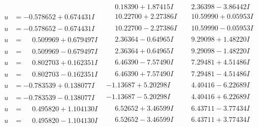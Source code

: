\documentclass[1p]{elsarticle_modified}
\theoremstyle{definition}
\begin{document}
$$\begin{array}{c|c|c}
 & \phantom{-}0.18390 + 1.87415 I & \phantom{-}2.36398 - 3.86442 I \\ \hline\begin{aligned}
u &= -0.578652 + 0.674431 I\end{aligned}
 & \phantom{-}10.22700 + 2.27386 I & \phantom{-}10.59990 + 0.05953 I \\ \hline\begin{aligned}
u &= -0.578652 - 0.674431 I\end{aligned}
 & \phantom{-}10.22700 - 2.27386 I & \phantom{-}10.59990 - 0.05953 I \\ \hline\begin{aligned}
u &= \phantom{-}0.509969 + 0.679497 I\end{aligned}
 & \phantom{-}2.36364 - 0.64965 I & \phantom{-}9.29098 + 1.48220 I \\ \hline\begin{aligned}
u &= \phantom{-}0.509969 - 0.679497 I\end{aligned}
 & \phantom{-}2.36364 + 0.64965 I & \phantom{-}9.29098 - 1.48220 I \\ \hline\begin{aligned}
u &= \phantom{-}0.802703 + 0.162351 I\end{aligned}
 & \phantom{-}6.46390 - 7.57490 I & \phantom{-}7.29481 + 4.51486 I \\ \hline\begin{aligned}
u &= \phantom{-}0.802703 - 0.162351 I\end{aligned}
 & \phantom{-}6.46390 + 7.57490 I & \phantom{-}7.29481 - 4.51486 I \\ \hline\begin{aligned}
u &= -0.783539 + 0.138077 I\end{aligned}
 & -1.13687 + 5.20298 I & \phantom{-}4.40416 - 6.22689 I \\ \hline\begin{aligned}
u &= -0.783539 - 0.138077 I\end{aligned}
 & -1.13687 - 5.20298 I & \phantom{-}4.40416 + 6.22689 I \\ \hline\begin{aligned}
u &= \phantom{-}0.495820 + 1.104130 I\end{aligned}
 & \phantom{-}6.52652 + 3.46599 I & \phantom{-}6.43711 - 3.77434 I \\ \hline\begin{aligned}
u &= \phantom{-}0.495820 - 1.104130 I\end{aligned}
 & \phantom{-}6.52652 - 3.46599 I & \phantom{-}6.43711 + 3.77434 I \\ \hline\begin{aligned}

\end{aligned}
\end{array}$$
\end{document}
